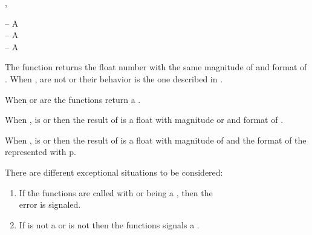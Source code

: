 \documentclass[../Type-Manipulation-Coercion.tex]{subfiles}
\begin{document}

\DSyntax{}

 ,  \RArrow {}

\DArgsNValues{}

 -- A \\
 -- A \\
 -- A \\

\DDescription{}

The function returns the float number  with the same magnitude of
 and format of . When
,  are not  or 
their behavior is the one described in \cite{1996:ANSIHyperSpec}.

\noindent
When  or  are
 the functions return a .

\noindent
When , is  or
 then the result of  is a float
with magnitude  or and
format of .

\noindent
When , is  or
 then the result of  is a float
with magnitude of  and the format of the 
represented with p.

\DExceptional{}

There are different exceptional situations to be considered:
\begin{enumerate}
\item If the functions are called with
   or  being a
  , then the\\
   error is signaled.
\item If  is not a \CL{}  or  is
  not \CL{}  then the functions signals a
  .
\end{enumerate}
\end{document}
